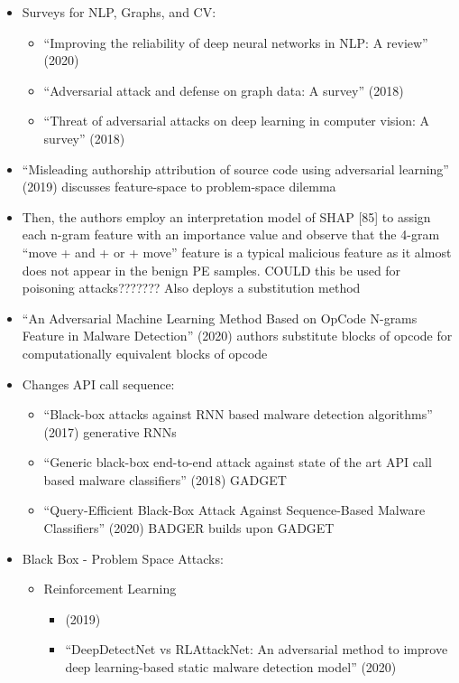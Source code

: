 \documentclass{article}
\begin{document}
\begin{itemize}
	\item Surveys for NLP, Graphs, and CV:
	\begin{itemize}
		\item ``Improving the reliability of deep neural networks in NLP: A review'' (2020)
		\item ``Adversarial attack and defense on graph data: A survey'' (2018)
		\item ``Threat of adversarial attacks on deep learning in computer vision: A survey'' (2018)
	\end{itemize}
	\item ``Misleading authorship attribution of source code using adversarial learning'' (2019) discusses feature-space to problem-space dilemma
	\item Then, the authors employ an interpretation model of SHAP [85] to assign each n-gram feature with an importance value and observe that the 4-gram “move + and + or + move” feature is a typical malicious feature as it almost does not appear in the benign PE samples. COULD this be used for poisoning attacks??????? Also deploys a substitution method 
	\item ``An Adversarial Machine Learning Method Based on OpCode N-grams Feature in Malware Detection'' (2020) authors substitute blocks of opcode for computationally equivalent blocks of opcode
	\item Changes API call sequence:
	\begin{itemize}
		\item ``Black-box attacks against RNN based malware detection algorithms'' (2017)  generative RNNs
		\item ``Generic black-box end-to-end attack against state of the art API call based malware classifiers'' (2018) GADGET
		\item ``Query-Efficient Black-Box Attack Against Sequence-Based Malware Classifiers'' (2020) BADGER builds upon GADGET
	\end{itemize}
	\item Black Box - Problem Space Attacks:
	\begin{itemize}
		\item Reinforcement Learning
		\begin{itemize}
			\item {} (2019)
			\item ``DeepDetectNet vs RLAttackNet: An adversarial method to improve deep learning-based static malware detection model'' (2020)

\end{itemize}
\end{itemize}
\end{itemize}
\end{document}
